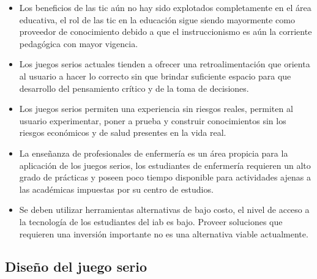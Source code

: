 \begin{itemize}

\item Los beneficios de las \gls{tic} aún no hay sido explotados completamente
    en el área  educativa, el rol de las \gls{tic} en la educación sigue siendo
    mayormente como proveedor de conocimiento debido a que el instruccionismo es
    aún la corriente pedagógica con mayor vigencia.

\item Los juegos serios actuales tienden a ofrecer una retroalimentación que
    orienta al usuario a hacer lo correcto sin que brindar suficiente espacio
    para que desarrollo del pensamiento crítico y de la toma de decisiones.
    

\item Los juegos serios permiten una experiencia sin riesgos reales, permiten
    al usuario experimentar, poner a prueba y construir conocimientos sin los
    riesgos económicos y de salud presentes en la vida real.

\item La enseñanza de profesionales de enfermería es un área propicia para la
    aplicación de los juegos serios, los estudiantes de enfermería requieren un
    alto grado de prácticas y poseen poco tiempo disponible para actividades
    ajenas a las académicas impuestas por su centro de estudios. 
    
\item Se deben utilizar herramientas alternativas de bajo costo, el nivel de acceso a la
    tecnología de los estudiantes del \gls{iab} es bajo. Proveer soluciones que
    requieren una inversión importante no es una alternativa viable actualmente.

\end{itemize}

\subsection{Diseño del juego serio}

